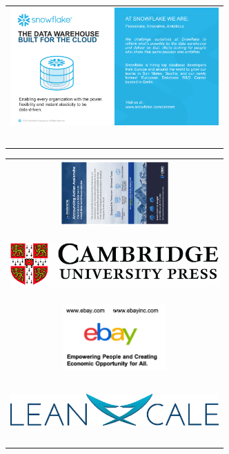 \begin{tabular}{C{\linewidth}}
\includegraphics[width=80mm]{ads/snowflake.pdf} \\ ~ \\
\end{tabular}




\begin{tabular}{C{\linewidth}}
\includegraphics[height=25mm,width=80mm,keepaspectratio]{ads/actian.pdf} \\ 
\includegraphics[height=25mm,width=80mm,keepaspectratio]{ads/cambridge.jpg}
\\ 
\includegraphics[height=25mm,width=80mm,keepaspectratio]{ads/ebay.png}
\\ 
\includegraphics[height=25mm,width=80mm,keepaspectratio]{ads/leanxscale.eps}
\end{tabular}


